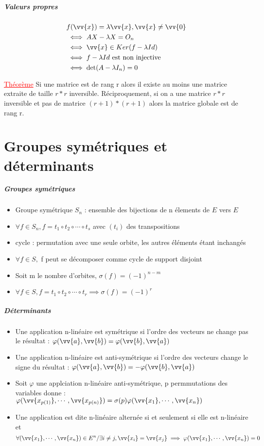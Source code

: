 \documentclass[a4paper, french]{article}
\newcommand{\la}{\lambda}
\newcommand{\ph}{\varphi}
\newcommand{\thm}{\textcolor{red}{\underline{Théorème} }}
\begin{document}
	\subparagraph{Valeurs propres}
			\begin{align*}
				&f(\vv{x}) = \la \vv{x}, \vv{x}\neq \vv{0} \\	 
				&\iff AX-\la X=O_n \\	 
				&\iff \vv{x}\in Ker(f-\la Id) \\	 
				&\iff f-\la Id \text{ est non injective} \\	 
				&\iff \det(A-\la I_n)=0
			\end{align*}
	
	 \thm Si une matrice est de rang r alors il existe au moins une matrice extraite de taille $r*r$ inversible. Réciproquement, si on a une matrice $r*r$ inversible et pas de matrice $(r+1)*(r+1)$ alors la matrice globale est de rang r.

	\section{Groupes symétriques et déterminants}
	\subparagraph{Groupes symétriques}
	\begin{itemize}[label=\(\bullet\)]
 		\item Groupe symétrique $S_n$ : ensemble des bijections de n élements de $E$ vers $E$
 		\item $\forall f \in S_n, f=t_1\circ t_2\circ \cdots \circ t_s$ avec $(t_i)$ des transpositions
 		\item cycle : permutation avec une seule orbite, les autres éléments étant inchangés
 		\item $\forall f \in S,$ f peut se décomposer comme cycle de support disjoint
		\item Soit m le nombre d'orbites, $\sigma(f)=(-1)^{n-m}$
		\item $\forall f \in S, f=t_1\circ t_2\circ \cdots \circ t_r \implies \sigma(f)=(-1)^r$
	\end{itemize}

	\subparagraph{Déterminants}
	\begin{itemize}[label=\(\bullet\)]
 		\item Une application n-linéaire est symétrique si l'ordre des vecteurs ne change pas le résultat : $\ph(\vv{a},\vv{b})=\ph(\vv{b},\vv{a})$
 		\item Une application n-linéaire est anti-symétrique si l'ordre des vecteurs change le signe du résultat : $\ph(\vv{a},\vv{b})= - \ph(\vv{b},\vv{a})$
 		\item Soit $\ph$ une applciation n-linéaire anti-symétrique, p permmutations des variables donne : $\ph(\vv{x_{p(1)}},\cdots,\vv{x_{p(n)}})= \sigma(p) \ph(\vv{x_1},\cdots,\vv{x_n})$
		\item Une application est dite n-linéaire alternée si et seulement si elle est n-linéaire et
		 \[\forall (\vv{x_1},\cdots,\vv{x_n}) \in E^n / \exists i  \neq j, \vv{x_i}=\vv{x_j} \implies \ph(\vv{x_1},\cdots,\vv{x_n})=0\]
	\end{itemize}
\end{document}
